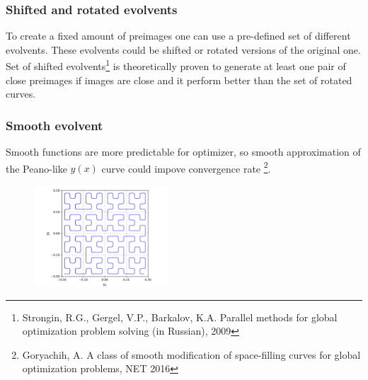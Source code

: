 \documentclass[aspectratio=1610]{beamer}
\begin{document}
\begin{frame}
  \frametitle{Shifted and rotated evolvents}
  To create a fixed amount of preimages one can use a pre-defined set of different evolvents. These evolvents could be shifted or rotated versions of the original one. Set of shifted evolvents\footnote{Strongin, R.G., Gergel, V.P., Barkalov, K.A. Parallel methods for global optimization problem
solving (in Russian), 2009} is theoretically proven to generate at least one pair of close preimages if images are close and it perform better than the set of rotated curves.
  \begin{figure}[ht]
  \end{figure}
%
\end{frame}

\begin{frame}
  \frametitle{Smooth evolvent}
  Smooth functions are more predictable for optimizer, so smooth approximation of the Peano-like \(y(x)\) curve could impove convergence rate \footnote{Goryachih, A. A class of smooth modification of space-filling curves for global optimization problems, NET 2016}.
  \begin{figure}[ht]
    \includegraphics[width=0.45\textwidth]{smooth.pdf}
  \end{figure}

\end{frame}
\end{document}
